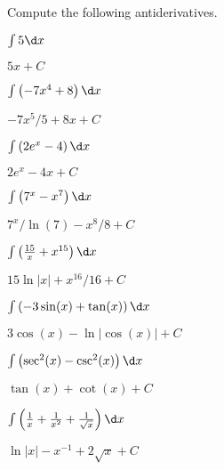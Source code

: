 \begin{exercises}
\noindent Compute the following antiderivatives.
\begin{multicols}{2}
\begin{exercise}
$\int 5\d x$
\begin{answer}
$5x+C$
\end{answer}
\end{exercise}

\begin{exercise}
$\int \left(-7x^4+8\right)\d x$
\begin{answer}
$-7x^5/5 +8x + C$
\end{answer}
\end{exercise}

\begin{exercise}
$\int \left(2e^x -4\right)\d x$
\begin{answer}
$2e^x -4x + C$
\end{answer}
\end{exercise}

\begin{exercise}
$\int \left(7^x - x^7\right)\d x$
\begin{answer}
$7^x/\ln(7) - x^8/8 +C$
\end{answer}
\end{exercise}


\begin{exercise}
$\int \left(\frac{15}{x}+x^{15}\right)\d x$
\begin{answer}
$15\ln|x| + x^{16}/16 + C$
\end{answer}
\end{exercise}


\begin{exercise}
$\int \left(-3\sin(x) + \tan(x)\right)\d x$
\begin{answer}
$3\cos(x) -\ln|\cos(x)|+C$
\end{answer}
\end{exercise}

\begin{exercise}
$\int \left(\sec^2(x) -\csc^2(x)\right) \d x$
\begin{answer}
$\tan(x) + \cot(x) + C$
\end{answer}
\end{exercise}


\begin{exercise}
$\int\left(\frac{1}{x} + \frac{1}{x^2} + \frac{1}{\sqrt{x}}\right)\d x$
\begin{answer}
$\ln|x|  - x^{-1} + 2\sqrt{x} +C$ 
\end{answer}
\end{exercise}


\end{multicols}
\end{exercises}
